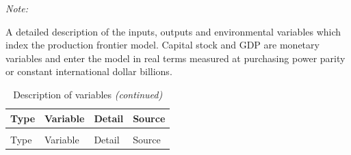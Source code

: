 \documentclass[
  10pt,
]{article}
\begin{document}
\begin{ThreePartTable}
\begin{TableNotes}
\item \textit{Note: } 
\item A detailed description of the inputs, outputs and environmental variables which index the production frontier model.  Capital stock and GDP are monetary variables and enter the model in real terms measured at purchasing power parity or constant international dollar billions.
\end{TableNotes}
\begin{longtabu} to 
\caption{\label{tab:variables}Description of variables}\\
\toprule
Type & Variable & Detail & Source\\
\midrule
\endfirsthead
\caption[]{Description of variables \textit{(continued)}}\\
\toprule
Type & Variable & Detail & Source\\
\midrule
\endhead


\end{longtabu}
\end{ThreePartTable}
\end{document}

